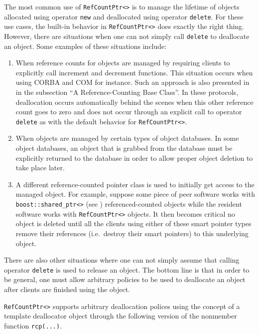 The most common use of {}\texttt{Ref\-Count\-Ptr<>} is to manage the
lifetime of objects allocated using operator {}\texttt{new} and
deallocated using operator {}\texttt{delete}.  For these use cases,
the built-in behavior in {}\texttt{Ref\-Count\-Ptr<>} does exactly the
right thing.  However, there are situations when one can not simply
call {}\texttt{delete} to deallocate an object.  Some examples of
these situations include:
%
\begin{enumerate}
\item
When reference counts for objects are managed by requiring clients to
explicitly call increment and decrement functions.  This situation
occurs when using CORBA {}\cite{ref:corba} and COM {}\cite{ref:com}
for instance.  Such an approach is also presented in {}\cite[Item
29]{ref:meyers_1996} in the subsection ``A Reference-Counting Base
Class''.  In these protocols, deallocation occurs automatically behind
the scenes when this other reference count goes to zero and does not
occur through an explicit call to operator {}\texttt{delete} as with
the default behavior for {}\texttt{Ref\-Count\-Ptr<>}.
\item
When objects are managed by certain types of object databases.  In
some object databases, an object that is grabbed from the database must
be explicitly returned to the database in order to allow proper object
deletion to take place later.
\item
A different reference-counted pointer class is used to initially get
access to the managed object.  For example, suppose some piece of peer
software works with {}\texttt{boost::shared\_ptr<>} (see
{}\cite{ref:boost}) referenced-counted objects while the resident
software works with {}\texttt{Ref\-Count\-Ptr<>} objects.  It then
becomes critical no object is deleted until all the clients using
either of these smart pointer types remove their references
(i.e.~destroy their smart pointers) to this underlying object.
\end{enumerate}
%
There are also other situations where one can not simply assume that
calling operator {}\texttt{delete} is used to release an object.  The
bottom line is that in order to be general, one must allow arbitrary
policies to be used to deallocate an object after clients are finished
using the object.

{}\texttt{Ref\-Count\-Ptr<>} supports arbitrary deallocation polices
using the concept of a template deallocator object through the
following version of the nonmember function {}\texttt{rcp(...)}.

